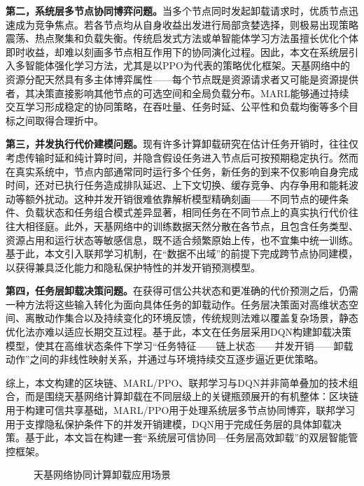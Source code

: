 \textbf{第二，系统层多节点协同博弈问题。}当多个节点同时发起卸载请求时，优质节点迅速成为竞争焦点。若各节点均从自身收益出发进行局部贪婪选择，则极易出现策略震荡、热点聚集和负载失衡。传统启发式方法或单智能体学习方法虽擅长优化个体即时收益，却难以刻画多节点相互作用下的协同演化过程。因此，本文在系统层引入多智能体强化学习方法，尤其是以PPO为代表的策略优化框架。天基网络中的资源分配天然具有多主体博弈属性——每个节点既是资源请求者又可能是资源提供者，其决策直接影响其他节点的可选空间和全局负载分布。MARL能够通过持续交互学习形成稳定的协同策略，在吞吐量、任务时延、公平性和负载均衡等多个目标之间取得合理折中\cite{ref1,ref2,ref3}。

\textbf{第三，并发执行代价建模问题。}现有许多计算卸载研究在估计任务开销时，往往仅考虑传输时延和纯计算时间，并隐含假设任务进入节点后可按预期稳定执行。然而在真实系统中，节点内部通常同时运行多个任务，新任务的到来不仅影响自身完成时间，还对已执行任务造成排队延迟、上下文切换、缓存竞争、内存争用和能耗波动等额外扰动。这种并发开销很难依靠解析模型精确刻画——不同节点的硬件条件、负载状态和任务组合模式差异显著，相同任务在不同节点上的真实执行代价往往大相径庭。此外，天基网络中的训练数据天然分散在各节点，且包含任务类型、资源占用和运行状态等敏感信息，既不适合频繁原始上传，也不宜集中统一训练。基于此，本文引入联邦学习机制，在“数据不出域”的前提下完成跨节点协同建模\cite{ref10,ref11}，以获得兼具泛化能力和隐私保护特性的并发开销预测模型。

\textbf{第四，任务层卸载决策问题。}在获得可信公共状态和更准确的代价预测之后，仍需一种方法将这些输入转化为面向具体任务的卸载动作。任务层决策面对高维状态空间、离散动作集合以及持续变化的环境反馈，传统规则法难以覆盖复杂场景，静态优化法亦难以适应长期交互过程。基于此，本文在任务层采用DQN构建卸载决策模型，使其在高维状态条件下学习“任务特征——链上状态——并发开销——卸载动作”之间的非线性映射关系，并通过与环境持续交互逐步逼近更优策略\cite{ref14}。

综上，本文构建的区块链、MARL/PPO、联邦学习与DQN并非简单叠加的技术组合，而是围绕天基网络计算卸载在不同层级上的关键瓶颈展开的有机整体：区块链用于构建可信共享基础，MARL/PPO用于处理系统层多节点协同博弈，联邦学习用于支撑隐私保护条件下的并发开销建模，DQN用于完成任务层的具体卸载决策。基于此，本文旨在构建一套“系统层可信协同—任务层高效卸载”的双层智能管控框架。

\begin{figure}[htbp]
  \centering
  \caption{天基网络协同计算卸载应用场景}
  \label{fig:scenario}
\end{figure}


